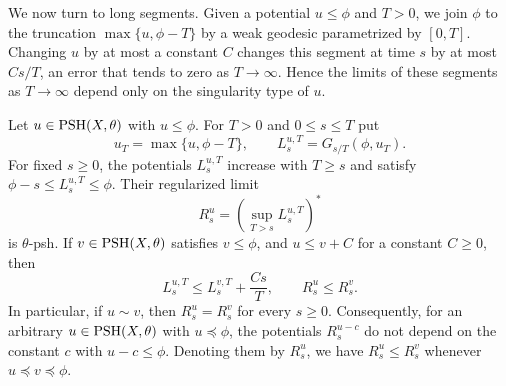 We now turn to long segments. Given a potential $u\leq\phi$ and $T>0$, we join $\phi$ to the truncation $\max\{u,\phi-T\}$ by a weak geodesic parametrized by $[0,T]$. Changing $u$ by at most a constant $C$ changes this segment at time $s$ by at most $Cs/T$, an error that tends to zero as $T\to\infty$. Hence the limits of these segments as $T\to\infty$ depend only on the singularity type of $u$.

\begin{proposition}\label{prop:long-perron-cutoff-type-stability}
Let $u\in\mathrm{PSH}(X,\theta)$ with $u\leq\phi$. For $T>0$ and $0\leq s\leq T$ put
\[
 u_T=\max\{u,\phi-T\},\qquad
 L_s^{u,T}=G_{s/T}(\phi,u_T).
\]
For fixed $s\geq0$, the potentials $L_s^{u,T}$ increase with $T\geq s$ and satisfy $\phi-s\leq L_s^{u,T}\leq\phi$. Their regularized limit
\[
 R_s^u=\left(\sup_{T>s}L_s^{u,T}\right)^*
\]
is $\theta$-psh. If $v\in\mathrm{PSH}(X,\theta)$ satisfies $v\leq\phi$, and $u\leq v+C$ for a constant $C\geq0$, then
\[
 L_s^{u,T}\leq L_s^{v,T}+\frac{Cs}{T},\qquad R_s^u\leq R_s^v.
\]
In particular, if $u\sim v$, then $R_s^u=R_s^v$ for every $s\geq0$. Consequently, for an arbitrary $u\in\mathrm{PSH}(X,\theta)$ with $u\preceq\phi$, the potentials $R_s^{u-c}$ do not depend on the constant $c$ with $u-c\leq\phi$. Denoting them by $R_s^u$, we have $R_s^u\leq R_s^v$ whenever $u\preceq v\preceq\phi$.
\end{proposition}
